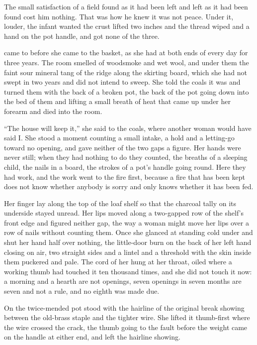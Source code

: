 The small satisfaction of a field found as it had been left and left as it had been found cost him nothing. That was how he knew it was not peace. Under it, louder, the infant wanted the crust lifted two inches and the thread wiped and a hand on the pot handle, and got none of the three.

\scenebreak

 came to  before she came to the basket, as she had at both ends of every day for three years. The room smelled of woodsmoke and wet wool, and under them the faint sour mineral tang of the  ridge along the skirting board, which she had not swept in two years and did not intend to sweep. She told the coals it was  and turned them with the back of a broken pot, the back of the pot going down into the bed of them and lifting a small breath of heat that came up under her forearm and died into the room.

“The house will keep it,” she said to the coals, where another woman would have said I. She stood a moment counting a small intake, a hold and a letting-go toward no opening, and gave neither of the two gaps a figure. Her hands were never still; when they had nothing to do they counted, the breaths of a sleeping child, the nails in a board, the strokes of a pot's handle going round. Here they had work, and the work went to the fire first, because a fire that has been kept does not know whether anybody is sorry and only knows whether it has been fed.

Her finger lay along the top of the loaf shelf so that the charcoal tally on its underside stayed unread. Her lips moved along a two-gapped row of the shelf's front edge and figured neither gap, the way a woman might move her lips over a row of nails without counting them. Once she glanced at  standing cold under  and shut her hand half over nothing, the little-door burn on the back of her left hand closing on air, two straight sides and a lintel and a threshold with the skin inside them puckered and pale. The cord of her  hung at her throat, oiled where a working thumb had touched it ten thousand times, and she did not touch it now: a morning and a hearth are not openings, seven openings in seven months are seven and not a rule, and no eighth was made due.

On  the twice-mended pot stood with the hairline of the original break showing between the old-brass staple and the tighter wire. She lifted it thumb-first where the wire crossed the crack, the thumb going to the fault before the weight came on the handle at either end, and left the hairline showing.


